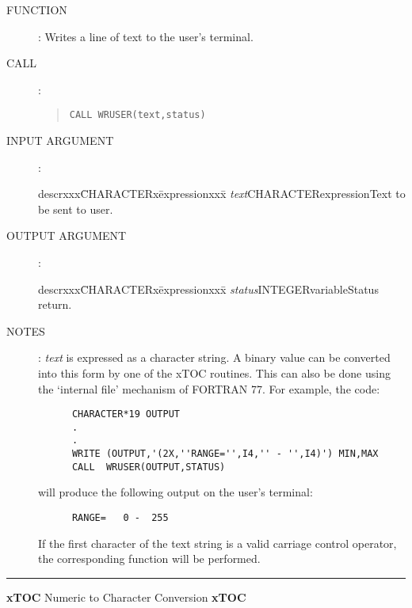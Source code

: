 \begin{description}
\item [FUNCTION]:
Writes a line of text to the user's terminal.
\item [CALL]:
\begin{quote}
{\tt CALL WRUSER(text,status)}
\end{quote}
\item [INPUT ARGUMENT]:
\begin{tabbing}
descrxxx\=CHARACTERx\=expressionxxx\=\kill
{\em text}\>CHARACTER\>expression\>Text to be sent to user.
\end{tabbing}
\item [OUTPUT ARGUMENT]:
\begin{tabbing}
descrxxx\=CHARACTERx\=expressionxxx\=\kill
{\em status}\>INTEGER\>variable\>Status return.
\end{tabbing}
\item [NOTES]:
{\em text} is expressed as a character string.
A binary value can be  converted into this form by one of the xTOC routines.
This can also be done using the `internal file' mechanism of FORTRAN 77.
For example, the code:
\begin{verbatim}
      CHARACTER*19 OUTPUT
      .
      .
      WRITE (OUTPUT,'(2X,''RANGE='',I4,'' - '',I4)') MIN,MAX
      CALL  WRUSER(OUTPUT,STATUS)
\end{verbatim}
will produce the following output on the user's terminal:
\begin{verbatim}
      RANGE=   0 -  255
\end{verbatim}
If the first character of the text string is a valid carriage control operator,
the corresponding function will be performed.
\end{description}
\rule{\textwidth}{0.3mm}
{\Large {\bf xTOC} \hfill Numeric to Character Conversion \hfill {\bf xTOC}}
